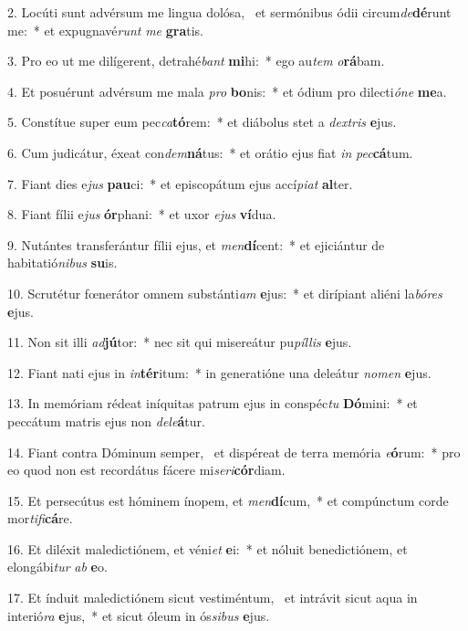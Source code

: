 2. Locúti sunt advérsum me lingua dolósa, \dag\  et sermónibus ódii circum\textit{de}\textbf{dé}runt me:~*  et expugnavé\textit{runt} \textit{me} \textbf{gra}tis.\

3. Pro eo ut me dilígerent, detrahé\textit{bant} \textbf{mi}hi:~*  ego au\textit{tem} \textit{o}\textbf{rá}bam.\

4. Et posuérunt advérsum me mala \textit{pro} \textbf{bo}nis:~*  et ódium pro dilecti\textit{ó}\textit{ne} \textbf{me}a.\

5. Constítue super eum pec\textit{ca}\textbf{tó}rem:~*  et diábolus stet a \textit{dex}\textit{tris} \textbf{e}jus.\

6. Cum judicátur, éxeat con\textit{dem}\textbf{ná}tus:~*  et orátio ejus fiat \textit{in} \textit{pec}\textbf{cá}tum.\

7. Fiant dies e\textit{jus} \textbf{pau}ci:~*  et episcopátum ejus accí\textit{pi}\textit{at} \textbf{al}ter.\

8. Fiant fílii e\textit{jus} \textbf{ór}phani:~*  et uxor \textit{e}\textit{jus} \textbf{ví}dua.\

9. Nutántes transferántur fílii ejus, et \textit{men}\textbf{dí}cent:~*  et ejiciántur de habitatió\textit{ni}\textit{bus} \textbf{su}is.\

10. Scrutétur fœnerátor omnem substánti\textit{am} \textbf{e}jus:~*  et dirípiant aliéni la\textit{bó}\textit{res} \textbf{e}jus.\

11. Non sit illi \textit{ad}\textbf{jú}tor:~*  nec sit qui misereátur pu\textit{píl}\textit{lis} \textbf{e}jus.\

12. Fiant nati ejus in \textit{in}\textbf{tér}itum:~*  in generatióne una deleátur \textit{no}\textit{men} \textbf{e}jus.\

13. In memóriam rédeat iníquitas patrum ejus in conspéc\textit{tu} \textbf{Dó}mini:~*  et peccátum matris ejus non \textit{de}\textit{le}\textbf{á}tur.\

14. Fiant contra Dóminum semper, \dag\  et dispéreat de terra memória \textit{e}\textbf{ó}rum:~*  pro eo quod non est recordátus fácere mi\textit{se}\textit{ri}\textbf{cór}diam.\

15. Et persecútus est hóminem ínopem, et \textit{men}\textbf{dí}cum,~*  et compúnctum corde mor\textit{ti}\textit{fi}\textbf{cá}re.\

16. Et diléxit maledictiónem, et véni\textit{et} \textbf{e}i:~*  et nóluit benedictiónem, et elongábi\textit{tur} \textit{ab} \textbf{e}o.\

17. Et índuit maledictiónem sicut vestiméntum, \dag\  et intrávit sicut aqua in interió\textit{ra} \textbf{e}jus,~*  et sicut óleum in ós\textit{si}\textit{bus} \textbf{e}jus.\

